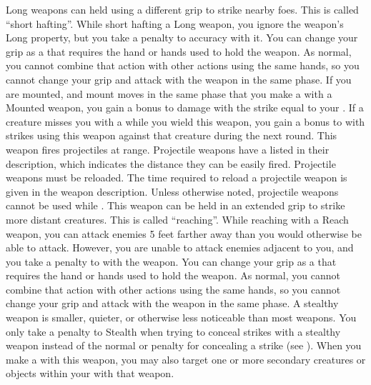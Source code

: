             Long weapons can held using a different grip to strike nearby foes.
            This is called ``short hafting''.
            While short hafting a Long weapon, you ignore the weapon's Long property, but you take a  penalty to accuracy with it.
            You can change your grip as a  that requires the hand or hands used to hold the weapon.
            As normal, you cannot combine that action with other actions using the same hands, so you cannot change your grip and attack with the weapon in the same phase.
            \label{Mounted Weapon} If you are mounted, and mount moves in the same phase that you make a  with a Mounted weapon, you gain a bonus to damage with the strike equal to your .
             If a creature misses you with a  while you wield this weapon, you gain a  bonus to  with strikes using this weapon against that creature during the next round.
             This weapon fires projectiles at range. Projectile weapons have a  listed in their description, which indicates the distance they can be easily fired. Projectile weapons must be reloaded. The time required to reload a projectile weapon is given in the weapon description.
            Unless otherwise noted, projectile weapons cannot be used while \prone.
            \label{Reach Weapon} This weapon can be held in an extended grip to strike more distant creatures.
            This is called ``reaching''.
            While reaching with a Reach weapon, you can attack enemies 5 feet farther away than you would otherwise be able to attack.
            However, you are unable to attack enemies adjacent to you, and you take a  penalty to  with the weapon.
            You can change your grip as a  that requires the hand or hands used to hold the weapon.
            As normal, you cannot combine that action with other actions using the same hands, so you cannot change your grip and attack with the weapon in the same phase.
            A stealthy weapon is smaller, quieter, or otherwise less noticeable than most weapons.
            You only take a  penalty to Stealth when trying to conceal strikes with a stealthy weapon instead of the normal  or  penalty for concealing a strike (see ).
            \label{Sweeping} When you make a   with this weapon, you may also target one or more secondary creatures or objects within your  with that weapon.
